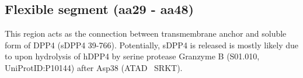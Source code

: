 \subsection{Flexible segment (aa29 - aa48)}

This region acts as the connection between transmembrane anchor and soluble form of DPP4 (sDPP4 39-766). Potentially, sDPP4 is released is mostly likely due to upon hydrolysis of hDPP4 by serine protease Granzyme B (S01.010, UniProtID:P10144) after Asp38 (ATAD~\textbar 
SRKT).~\cite{Song_2018} 
